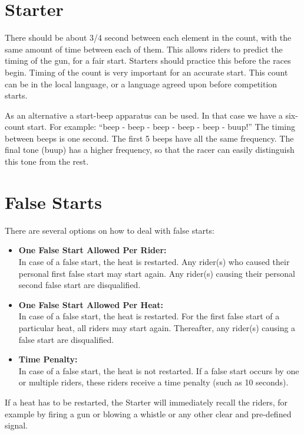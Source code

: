 \section{Starter}

There should be about 3/4 second between each element in the count, with the same amount of time between each of them.
This allows riders to predict the timing of the gun, for a fair start.
Starters should practice this before the races begin.
Timing of the count is very important for an accurate start.
This count can be in the local language, or a language agreed upon before competition starts.

As an alternative a start-beep apparatus can be used.
In that case we have a six-count start.
For example: ``beep - beep - beep - beep - beep - buup!''
The timing between beeps is one second.
The first 5 beeps have all the same frequency.
The final tone (buup) has a higher frequency, so that the racer can easily distinguish this tone from the rest.

\section{False Starts \label{subsec:false_starts}}

There are several options on how to deal with false starts:
\begin{itemize}
\item \textbf{One False Start Allowed Per Rider:}\\
In case of a false start, the heat is restarted.
Any rider(s) who caused their personal first false start may start again.
Any rider(s) causing their personal second false start are disqualified.
\item \textbf{One False Start Allowed Per Heat:}\\
In case of a false start, the heat is restarted.
For the first false start of a particular heat, all riders may start again.
Thereafter, any rider(s) causing a false start are disqualified.
\item \textbf{Time Penalty:}\\
In case of a false start, the heat is not restarted.
If a false start occurs by one or multiple riders, these riders receive a time penalty (such as 10 seconds).
\end{itemize}
If a heat has to be restarted, the Starter will immediately recall the riders, for example by firing a gun or blowing a whistle or any other clear and pre-defined signal.

